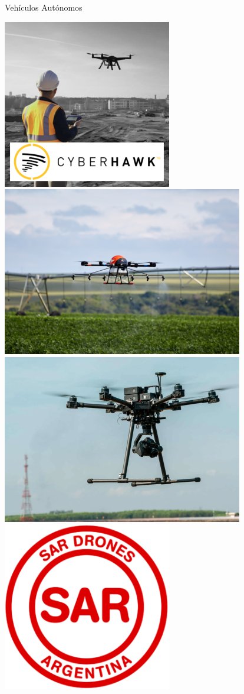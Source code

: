 \begin{frame}{Vehículos Autónomos}
{\begin{minipage}{1\textwidth}
		\includegraphics[height=.35\textheight,keepaspectratio]{img/drone_inspeccion_size.png}\\[20pt]
		\includegraphics[height=.35\textheight,keepaspectratio]{img/drone_agricultura_size.png}\hfill
		\includegraphics[height=.35\textheight,keepaspectratio]{img/drone_camera_size.png}\hfill
		\includegraphics[height=.35\textheight,keepaspectratio]{img/drones_sar_size.png}

\end{minipage}}
\end{frame}
